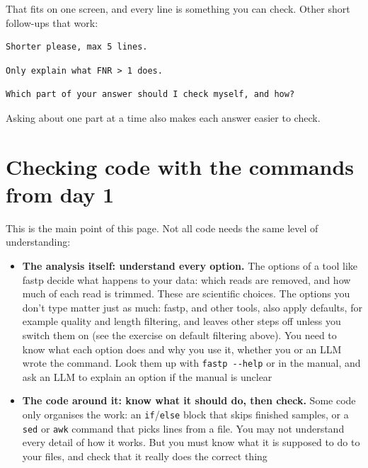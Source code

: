 \documentclass[
  letterpaper,
  DIV=11,
  numbers=noendperiod]{scrreprt}
\providecommand{\tightlist}{%
  \setlength{\itemsep}{0pt}\setlength{\parskip}{0pt}}
\begin{document}
\begin{tcolorbox}
That fits on one screen, and every line is something you can check.
Other short follow-ups that work:

\begin{verbatim}
Shorter please, max 5 lines.
\end{verbatim}

\begin{verbatim}
Only explain what FNR > 1 does.
\end{verbatim}

\begin{verbatim}
Which part of your answer should I check myself, and how?
\end{verbatim}

Asking about one part at a time also makes each answer easier to check.

\end{tcolorbox}

\section{Checking code with the commands from day
1}\label{checking-code-with-the-commands-from-day-1}

This is the main point of this page. Not all code needs the same level
of understanding:

\begin{itemize}
\tightlist
\item
  \textbf{The analysis itself: understand every option.} The options of
  a tool like fastp decide what happens to your data: which reads are
  removed, and how much of each read is trimmed. These are scientific
  choices. The options you don't type matter just as much: fastp, and
  other tools, also apply defaults, for example quality and length
  filtering, and leaves other steps off unless you switch them on (see
  the exercise on default filtering above). You need to know what each
  option does and why you use it, whether you or an LLM wrote the
  command. Look them up with \texttt{fastp\ -\/-help} or in the manual,
  and ask an LLM to explain an option if the manual is unclear
\item
  \textbf{The code around it: know what it should do, then check.} Some
  code only organises the work: an \texttt{if}/\texttt{else} block that
  skips finished samples, or a \texttt{sed} or \texttt{awk} command that
  picks lines from a file. You may not understand every detail of how it
  works. But you must know what it is supposed to do to your files, and
  check that it really does the correct thing
\end{itemize}
\end{document}
